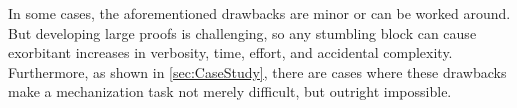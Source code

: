 In some cases, the aforementioned drawbacks are minor or can be worked around.
%
But developing large proofs is challenging, so any stumbling block can cause exorbitant increases in verbosity, time, effort, and accidental complexity.
%
Furthermore, as shown in \autoref{sec:CaseStudy}, there are cases where these drawbacks make a mechanization task not merely difficult, but outright impossible.







